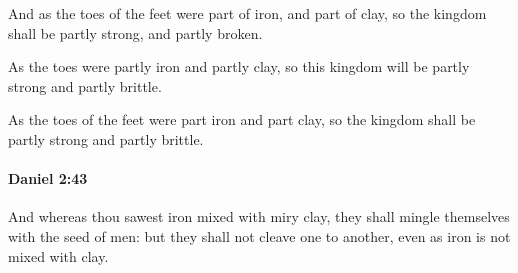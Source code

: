 			\begin{versebox}
					\item[BHS] 
					\item[LXX] 
					\item[ASV] And as the toes of the feet were part of iron, and part of clay, so the kingdom shall be partly strong, and partly broken.
					\item[NIV] As the toes were partly iron and partly clay, so this kingdom will be partly strong and partly brittle.
					\item[NRSV] As the toes of the feet were part iron and part clay, so the kingdom shall be partly strong and partly brittle.
			\end{versebox}

		\paragraph{Daniel 2:43} %
			\label{DANIEL-2-43}

			And whereas thou sawest iron mixed with miry clay, they shall mingle themselves with the seed of men: but they shall not cleave one to another, even as iron is not mixed with clay.

